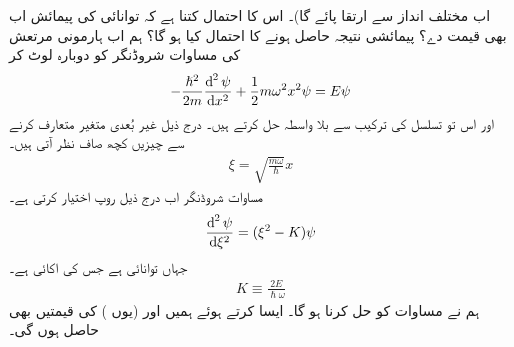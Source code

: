 اب مختلف انداز سے ارتقا پائے گا)۔ اس کا احتمال کتنا ہے کہ توانائی کی پیمائش اب بھی  قیمت دے؟ پیمائشی نتیجہ  حاصل ہونے کا احتمال کیا ہو گا؟
ہم اب ہارمونی مرتعش کی مساوات شروڈنگر کو دوبارہ لوٹ کر
\begin{align}\label{مساوات_شروڈنگر_تحلیلی_حل_الف}
-\frac{\hslash^{2}}{2m}\frac{\dif^{\,2}\psi}{\dif x^{2}}+\frac{1}{2}m\omega^{2}x^{2}\psi=E\psi
\end{align}
اور اس تو تسلسل کی ترکیب سے بلا واسطہ حل کرتے ہیں۔ درج ذیل غیر بُعدی متغیر متعارف کرنے سے چیزیں کچھ صاف نظر آتی ہیں۔
\begin{align}
\xi=\sqrt{\frac{m\omega}{\hslash}}x
\end{align}
مساوات شروڈنگر اب درج ذیل روپ اختیار کرتی ہے۔
\begin{align}\label{مساوات_شروڈنگر_تحلیلی_شروڈنگر}
\frac{\dif^{\,2}\psi}{\dif \xi^{2}}=(\xi^{2}-K)\psi
\end{align}
جہاں  توانائی ہے جس کی اکائی  ہے۔
\begin{align}\label{مساوات_شروڈنگر_تحلیلی_مستقل}
K\equiv \frac{2E}{\hslash\omega}
\end{align}
ہم نے مساوات  کو حل کرنا ہو گا۔ ایسا کرتے ہوئے ہمیں  اور (یوں ) کی  قیمتیں بھی حاصل ہوں گی۔ 

